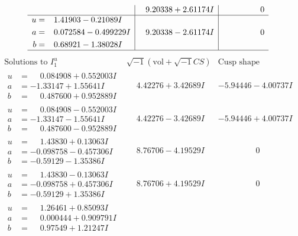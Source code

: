 \documentclass[1p]{elsarticle_modified}
\theoremstyle{definition}
\newcommand{\I}{\sqrt{-1}}
\begin{document}
$$\begin{array}{c|c|c}
 & \phantom{-}9.20338 + 2.61174 I & \phantom{-0.000000 } 0 \\ \hline\begin{aligned}
u &= \phantom{-}1.41903 - 0.21089 I \\
a &= \phantom{-}0.072584 - 0.499229 I \\
b &= \phantom{-}0.68921 - 1.38028 I\end{aligned}
 & \phantom{-}9.20338 - 2.61174 I & \phantom{-0.000000 } 0\\
 \hline 
 \end{array}$$\newpage$$\begin{array}{c|c|c}  
\text{Solutions to }I^u_{1}& \I (\text{vol} + \sqrt{-1}CS) & \text{Cusp shape}\\
 \hline 
\begin{aligned}
u &= \phantom{-}0.084908 + 0.552003 I \\
a &= -1.33147 + 1.55641 I \\
b &= \phantom{-}0.487600 + 0.952889 I\end{aligned}
 & \phantom{-}4.42276 + 3.42689 I & -5.94446 - 4.00737 I \\ \hline\begin{aligned}
u &= \phantom{-}0.084908 - 0.552003 I \\
a &= -1.33147 - 1.55641 I \\
b &= \phantom{-}0.487600 - 0.952889 I\end{aligned}
 & \phantom{-}4.42276 - 3.42689 I & -5.94446 + 4.00737 I \\ \hline\begin{aligned}
u &= \phantom{-}1.43830 + 0.13063 I \\
a &= -0.098758 - 0.457306 I \\
b &= -0.59129 - 1.35386 I\end{aligned}
 & \phantom{-}8.76706 - 4.19529 I & \phantom{-0.000000 } 0 \\ \hline\begin{aligned}
u &= \phantom{-}1.43830 - 0.13063 I \\
a &= -0.098758 + 0.457306 I \\
b &= -0.59129 + 1.35386 I\end{aligned}
 & \phantom{-}8.76706 + 4.19529 I & \phantom{-0.000000 } 0 \\ \hline\begin{aligned}
u &= \phantom{-}1.26461 + 0.85093 I \\
a &= \phantom{-}0.000444 + 0.909791 I \\
b &= \phantom{-}0.97549 + 1.21247 I\end{aligned}

\end{array}$$
\end{document}
